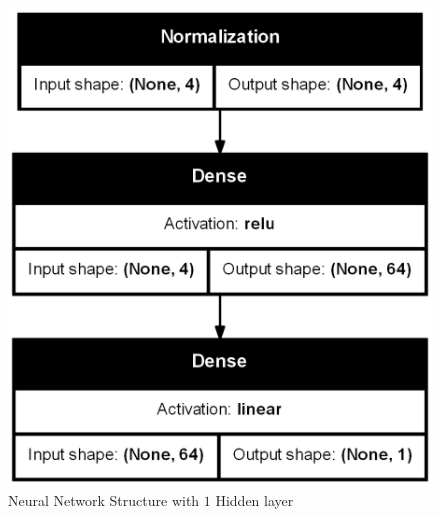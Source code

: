 \begin{figure}[H]
  \centering
  \begin{minipage}{0.4\textwidth}
      \centering
      \includegraphics[width=\linewidth]{images/Results/Neural Net/1HL/structure.png}
      \caption{Neural Network Structure with $1$ Hidden layer}
  \end{minipage}
  \hfill
  \begin{minipage}{0.4\textwidth}
      \centering

\end{minipage}
\end{figure}
